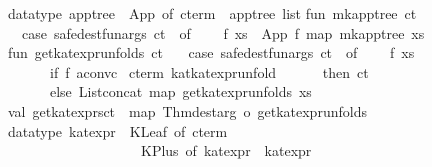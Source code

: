 \begin{isabellebody}
\isanewline
datatype\ apptree\ {}\ App\ of\ cterm\ {}\ apptree\ list\isanewline
\isanewline
fun\ mk{}apptree\ ct\ {}\isanewline
\ \ case\ safe{}dest{}funargs\ ct\ {}{}\ of\isanewline
\ \ \ \ {}f{}\ xs{}\ {}{}\ App\ {}f{}\ map\ mk{}apptree\ xs{}\isanewline
\isanewline
fun\ get{}kat{}expr{}unfolds\ ct\ {}\isanewline
\ \ case\ safe{}dest{}funargs\ ct\ {}{}\ of\isanewline
\ \ \ \ {}f{}\ xs{}\ {}{}\isanewline
\ \ \ \ \ \ if\ f\ aconvc\ %
\isaantiq
cterm\ {}kat{}kat{}expr{}unfold{}{}%
\endisaantiq
\isanewline
\ \ \ \ \ \ then\ {}ct{}\isanewline
\ \ \ \ \ \ else\ List{}concat\ {}map\ get{}kat{}expr{}unfolds\ xs{}\isanewline
\isanewline
val\ get{}kat{}exprs{}ct\ {}\ map\ Thm{}dest{}arg\ o\ get{}kat{}expr{}unfolds\isanewline
\isanewline
datatype\ kat{}expr\ {}\ KLeaf\ of\ cterm\isanewline
\ \ \ \ \ \ \ \ \ \ \ \ \ \ \ \ \ \ {}\ KPlus\ of\ kat{}expr\ {}\ kat{}expr\isanewline

\end{isabellebody}

